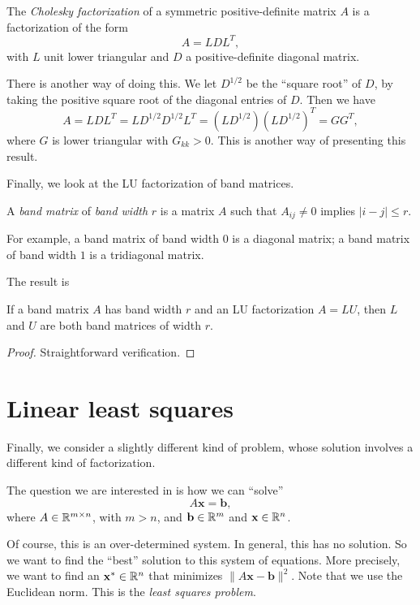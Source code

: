 \documentclass[a4paper]{article}
\begin{document}
\begin{defi}
  The \emph{Cholesky factorization} of a symmetric positive-definite matrix $A$ is a factorization of the form
  \[
    A = LDL^T,
  \]
  with $L$ unit lower triangular and $D$ a positive-definite diagonal matrix.
\end{defi}
There is another way of doing this. We let $D^{1/2}$ be the ``square root'' of $D$, by taking the positive square root of the diagonal entries of $D$. Then we have
\[
  A = LDL^T = LD^{1/2}D^{1/2}L^T = (LD^{1/2})(LD^{1/2})^T = GG^T,
\]
where $G$ is lower triangular with $G_{kk} > 0$. This is another way of presenting this result.

Finally, we look at the LU factorization of band matrices.
\begin{defi}
  A \emph{band matrix} of \emph{band width} $r$ is a matrix $A$ such that $A_{ij} \not= 0$ implies $|i - j| \leq r$.
\end{defi}
For example, a band matrix of band width $0$ is a diagonal matrix; a band matrix of band width $1$ is a tridiagonal matrix.
\begin{center}
\end{center}
The result is
\begin{prop}
  If a band matrix $A$ has band width $r$ and an LU factorization $A = LU$, then $L$ and $U$ are both band matrices of width $r$.
\end{prop}

\begin{proof}
  Straightforward verification.
\end{proof}

\section{Linear least squares}
Finally, we consider a slightly different kind of problem, whose solution involves a different kind of factorization.

The question we are interested in is how we can ``solve''
\[
  A\mathbf{x} = \mathbf{b},
\]
where $A \in \mathbb{R}^{m \times n}$, with $m > n$, and $\mathbf{b} \in \mathbb{R}^m$ and $\mathbf{x} \in \mathbb{R}^n$.

Of course, this is an over-determined system. In general, this has no solution. So we want to find the ``best'' solution to this system of equations. More precisely, we want to find an $\mathbf{x}^* \in \mathbb{R}^n$ that minimizes $\|A\mathbf{x} - \mathbf{b}\|^2$. Note that we use the Euclidean norm. This is the \emph{least squares problem}.
\end{document}
